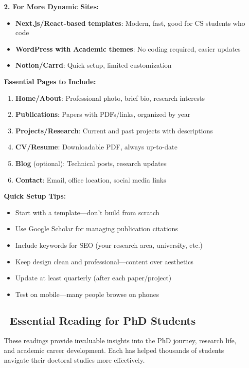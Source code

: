 \documentclass[11pt,a4paper]{article}
\begin{document}
\textbf{2. For More Dynamic Sites:}
\begin{itemize}
    \item \textbf{Next.js/React-based templates}: Modern, fast, good for CS students who code
    \item \textbf{WordPress with Academic themes}: No coding required, easier updates
    \item \textbf{Notion/Carrd}: Quick setup, limited customization
\end{itemize}

\textbf{Essential Pages to Include:}
\begin{enumerate}
    \item \textbf{Home/About}: Professional photo, brief bio, research interests
    \item \textbf{Publications}: Papers with PDFs/links, organized by year
    \item \textbf{Projects/Research}: Current and past projects with descriptions
    \item \textbf{CV/Resume}: Downloadable PDF, always up-to-date
    \item \textbf{Blog} (optional): Technical posts, research updates
    \item \textbf{Contact}: Email, office location, social media links
\end{enumerate}

\textbf{Quick Setup Tips:}
\begin{itemize}
    \item Start with a template—don't build from scratch
    \item Use Google Scholar for managing publication citations
    \item Include keywords for SEO (your research area, university, etc.)
    \item Keep design clean and professional—content over aesthetics
    \item Update at least quarterly (after each paper/project)
    \item Test on mobile—many people browse on phones
\end{itemize}


\subsection{\faBookOpen~Essential Reading for PhD Students}

\begin{tcolorbox}[colback=blue!5,colframe=darkblue,title=Must-Read Books and Articles]
These readings provide invaluable insights into the PhD journey, research life, and academic career development. Each has helped thousands of students navigate their doctoral studies more effectively.
\end{tcolorbox}
\end{document}
